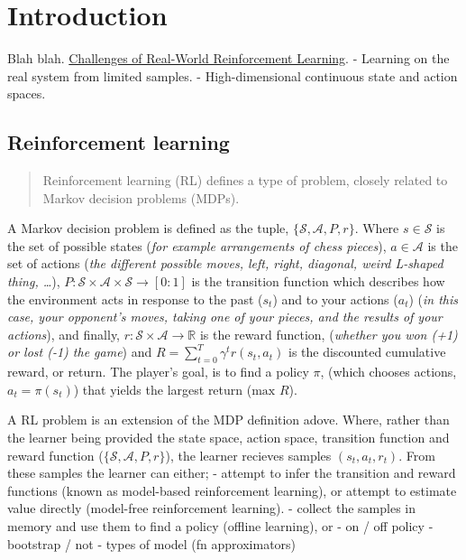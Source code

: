 \chapter{Introduction}\label{C:intro}

Blah blah. \href{https://arxiv.org/abs/1904.12901}{Challenges of
Real-World Reinforcement Learning}. - Learning on the real system from
limited samples. - High-dimensional continuous state and action spaces.

\hypertarget{reinforcement-learning}{%
\section{Reinforcement learning}\label{reinforcement-learning}}

\begin{quote}
Reinforcement learning (RL) defines a type of problem, closely related
to Markov decision problems (MDPs).
\end{quote}

A Markov decision problem is defined as the tuple,
\(\{\mathcal S, \mathcal A, P, r\}\). Where \(s \in \mathcal S\) is the
set of possible states (\emph{for example arrangements of chess
pieces}), \(a \in \mathcal A\) is the set of actions (\emph{the
different possible moves, left, right, diagonal, weird L-shaped thing,
\ldots{}}),
\(P: \mathcal S\times \mathcal A \times \mathcal S \to [0:1]\) is the
transition function which describes how the environment acts in response
to the past (\(s_t\)) and to your actions (\(a_t\)) (\emph{in this case,
your opponent's moves, taking one of your pieces, and the results of
your actions}), and finally,
\(r: \mathcal S\times \mathcal A \to \mathbb R\) is the reward function,
(\emph{whether you won (+1) or lost (-1) the game}) and
\(R = \sum_{t=0}^T \gamma^t r(s_t, a_t)\) is the discounted cumulative
reward, or return. The player's goal, is to find a policy \(\pi\),
(which chooses actions, \(a_t = \pi(s_t)\)) that yields the largest
return (\(\text{max } R\)).

A RL problem is an extension of the MDP definition adove. Where, rather
than the learner being provided the state space, action space,
transition function and reward function
(\(\{\mathcal S, \mathcal A, P,r\}\)), the learner recieves samples
\((s_t, a_t, r_t)\). From these samples the learner can either; -
attempt to infer the transition and reward functions (known as
model-based reinforcement learning), or attempt to estimate value
directly (model-free reinforcement learning). - collect the samples in
memory and use them to find a policy (offline learning), or - on / off
policy - bootstrap / not - types of model (fn approximators)

